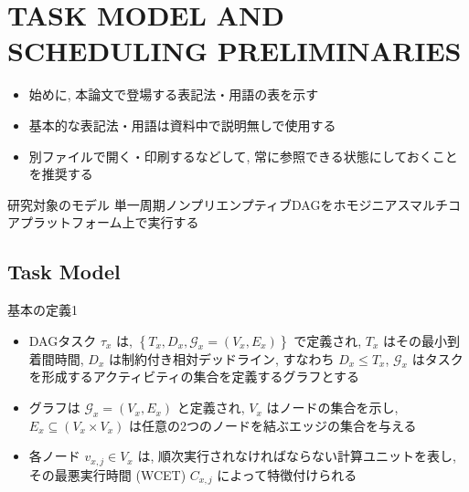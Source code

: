 
\section{TASK MODEL AND SCHEDULING PRELIMINARIES}
\label{sec: t}

\begin{frame}{}
    \begin{itemize}
        \item 始めに, 本論文で登場する表記法・用語の表を示す
        \item 基本的な表記法・用語は資料中で説明無しで使用する
        \item 別ファイルで開く・印刷するなどして, 常に参照できる状態にしておくことを推奨する
    \end{itemize}
\end{frame}



\begin{frame}{研究対象のモデル}
    単一周期ノンプリエンプティブDAGをホモジニアスマルチコアプラットフォーム上で実行する
\end{frame}

\subsection{Task Model}
\label{ssec: ta}

\begin{frame}{基本の定義1}
    \begin{itemize}
        \item DAGタスク $\tau_{x}$ は, $\left\{T_{x}, D_{x}, \mathcal{G}_{x}=\left(V_{x}, E_{x}\right)\right\}$ で定義され, $T_{x}$ はその最小到着間時間, $D_{x}$ は制約付き相対デッドライン, すなわち $D_{x} \leq T_{x}$, $\mathcal{G}_{x}$ はタスクを形成するアクティビティの集合を定義するグラフとする
        \item グラフは $\mathcal{G}_{x}=\left(V_{x}, E_{x}\right)$ と定義され, $V_{x}$ はノードの集合を示し, $E_{x} \subseteq\left(V_{x} \times V_{x}\right)$ は任意の2つのノードを結ぶエッジの集合を与える
        \item 各ノード $v_{x, j} \in V_{x}$ は, 順次実行されなければならない計算ユニットを表し, その最悪実行時間 (WCET)  $C_{x, j}$ によって特徴付けられる
    \end{itemize}
\end{frame}


